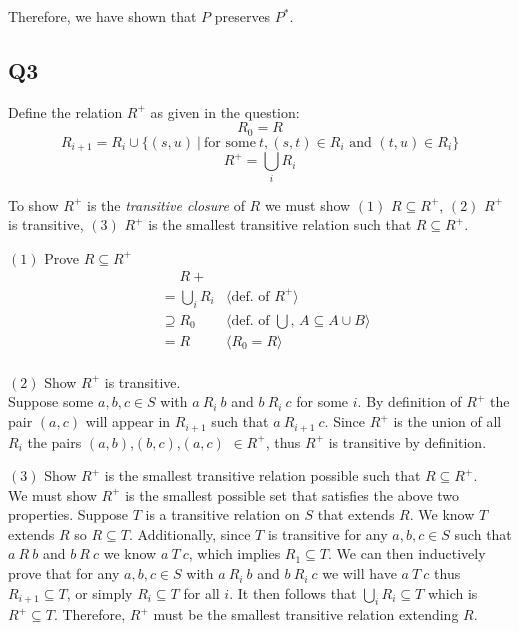 \documentclass[12pt, fleqn]{article}
\newcommand{\pnote}[1]{{\langle \text{#1} \rangle}}
\begin{document}
Therefore, we have shown that $P$ preserves $P^*$.

\subsection{Q3}

Define the relation $R^+$ as given in the question:
$$R_0 = R$$ 
$$R_{i+1} = R_i \cup \{(s,u) \: | \: \text{for some} \: t, (s,t) \in R_i \text{ and } (t,u) \in R_i\}$$
$$R^{+} = \bigcup_i R_i$$

To show $R^+$ is the \emph{transitive closure} of $R$ we must show $(1)$ $R \subseteq R^+$, $(2)$ $R^+$ is transitive,
$(3)$ $R^+$ is the smallest transitive relation such that $R \subseteq R^+$.

\medskip

$(1)$ Prove $R \subseteq R^+$
\begin{align*}
&\phantom{{}=} R+ & \\
&= \bigcup_i R_i & \pnote{def. of $R^+$} \\
&\supseteq R_0 & \pnote{def. of $\bigcup$, $A \subseteq A \cup B$} \\
&= R  & \pnote{$R_0 = R$} \\
\end{align*}

$(2)$ Show $R^+$ is transitive.\\
Suppose some $a, b, c \in S$ with $a~R_i~b$ and $b~R_i~c$ for some $i$. By definition of $R^+$ 
the pair $(a, c)$ will appear in $R_{i+1}$ such that $a~R_{i+1}~c$. Since $R^+$ is the union of all $R_i$
the pairs $(a, b)$,$(b, c)$,$(a, c)$ $\in R^+$, thus $R^+$ is transitive by definition.

\medskip

$(3)$ Show $R^+$ is the smallest transitive relation possible such that $R \subseteq R^+$.\\
We must show $R^+$ is the smallest possible set that satisfies the above two properties. Suppose $T$ is a transitive relation on $S$ that
extends $R$. We know $T$ extends $R$ so $R \subseteq T$. Additionally, since $T$ is transitive
for any $a, b, c \in S$ such that $a~R~b$ and $b~R~c$ we know $a~T~c$, which implies $R_1 \subseteq T$. We can then inductively prove
that for any $a, b, c \in S$ with $a~R_i~b$ and $b~R_i~c$ we will have $a~T~c$ thus $R_{i+1} \subseteq T$, or simply $R_i \subseteq T$ for all $i$.
It then follows that $\bigcup_i R_i \subseteq T$ which is $R^+ \subseteq T$. Therefore, $R^+$ must be the smallest transitive relation extending $R$.
\end{document}
